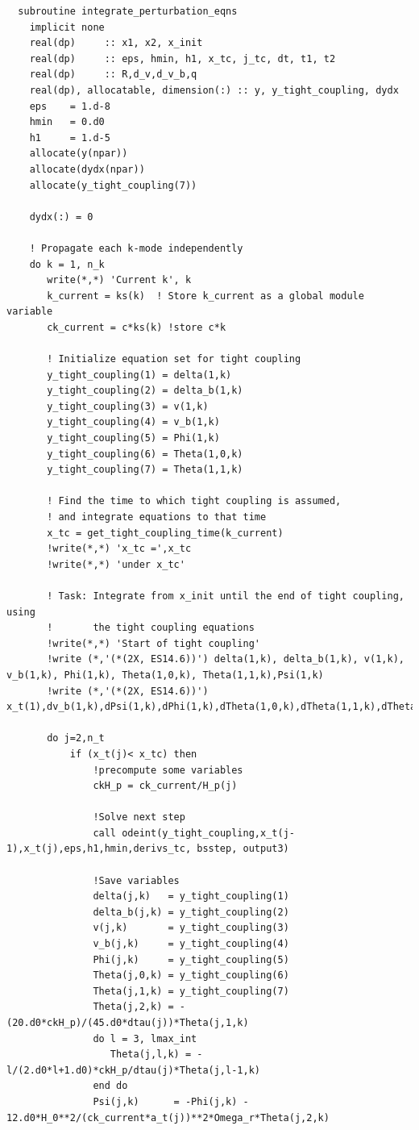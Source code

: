 \documentclass[a4paper]{report}
\begin{document}
\begin{verbatim}
  subroutine integrate_perturbation_eqns
    implicit none
    real(dp)     :: x1, x2, x_init
    real(dp)     :: eps, hmin, h1, x_tc, j_tc, dt, t1, t2
    real(dp)     :: R,d_v,d_v_b,q
    real(dp), allocatable, dimension(:) :: y, y_tight_coupling, dydx
    eps    = 1.d-8
    hmin   = 0.d0
    h1     = 1.d-5
    allocate(y(npar))
    allocate(dydx(npar))
    allocate(y_tight_coupling(7))

    dydx(:) = 0

    ! Propagate each k-mode independently
    do k = 1, n_k
       write(*,*) 'Current k', k
       k_current = ks(k)  ! Store k_current as a global module variable
       ck_current = c*ks(k) !store c*k

       ! Initialize equation set for tight coupling
       y_tight_coupling(1) = delta(1,k)
       y_tight_coupling(2) = delta_b(1,k)
       y_tight_coupling(3) = v(1,k)
       y_tight_coupling(4) = v_b(1,k)
       y_tight_coupling(5) = Phi(1,k)
       y_tight_coupling(6) = Theta(1,0,k)
       y_tight_coupling(7) = Theta(1,1,k)
       
       ! Find the time to which tight coupling is assumed, 
       ! and integrate equations to that time
       x_tc = get_tight_coupling_time(k_current)
       !write(*,*) 'x_tc =',x_tc
       !write(*,*) 'under x_tc'

       ! Task: Integrate from x_init until the end of tight coupling, using
       !       the tight coupling equations
       !write(*,*) 'Start of tight coupling'
       !write (*,'(*(2X, ES14.6))') delta(1,k), delta_b(1,k), v(1,k), v_b(1,k), Phi(1,k), Theta(1,0,k), Theta(1,1,k),Psi(1,k)
       !write (*,'(*(2X, ES14.6))') x_t(1),dv_b(1,k),dPsi(1,k),dPhi(1,k),dTheta(1,0,k),dTheta(1,1,k),dTheta(1,2,k)

       do j=2,n_t
           if (x_t(j)< x_tc) then 
               !precompute some variables
               ckH_p = ck_current/H_p(j)

               !Solve next step
               call odeint(y_tight_coupling,x_t(j-1),x_t(j),eps,h1,hmin,derivs_tc, bsstep, output3)

               !Save variables
               delta(j,k)   = y_tight_coupling(1)
               delta_b(j,k) = y_tight_coupling(2)
               v(j,k)       = y_tight_coupling(3)
               v_b(j,k)     = y_tight_coupling(4)
               Phi(j,k)     = y_tight_coupling(5)
               Theta(j,0,k) = y_tight_coupling(6)
               Theta(j,1,k) = y_tight_coupling(7)
               Theta(j,2,k) = -(20.d0*ckH_p)/(45.d0*dtau(j))*Theta(j,1,k)
               do l = 3, lmax_int
                  Theta(j,l,k) = -l/(2.d0*l+1.d0)*ckH_p/dtau(j)*Theta(j,l-1,k)
               end do	
               Psi(j,k)      = -Phi(j,k) - 12.d0*H_0**2/(ck_current*a_t(j))**2*Omega_r*Theta(j,2,k)


\end{verbatim}
\end{document}
